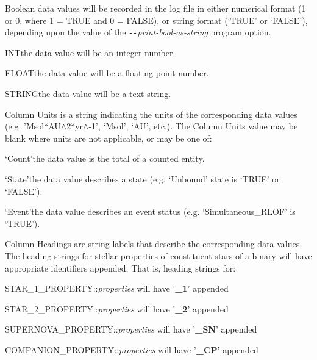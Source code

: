 \hfill
\begin{minipage}{\dimexpr\textwidth-7.5em}
Boolean data values will be recorded in the log file in either numerical format (1 or 0, where 1 = TRUE and  0 = FALSE), or string format (`TRUE' or `FALSE'), depending upon the value of the \textit{\texttt{-{}-}print-bool-as-string} program option.
\end{minipage}

\medskip
\medskip
\tabto{3em}INT\tabto{7.5em}the data value will be an integer number.

\tabto{3em}FLOAT\tabto{7.5em}the data value will be a floating-point number.

\tabto{3em}STRING\tabto{7.5em}the data value will be a text string.

\bigskip
Column Units is a string indicating the units of the corresponding data values (e.g. 'Msol*AU$\mathrm{\wedge}$2*yr$\mathrm{\wedge}$-1', `Msol', `AU', etc.).  The Column Units value may be blank where units are not applicable, or may be one of:

\tabto{3em}`Count'\tabto{7.5em}the data value is the total of a counted entity.

\tabto{3em}`State'\tabto{7.5em}the data value describes a state (e.g. `Unbound' state is `TRUE' or `FALSE').

\tabto{3em}`Event'\tabto{7.5em}the data value describes an event status (e.g. `Simultaneous\_RLOF' is `TRUE').

\bigskip
Column Headings are string labels that describe the corresponding data values. The heading strings for stellar properties of constituent stars of a binary will have appropriate identifiers appended. That is, heading strings for:

\hfill
\begin{minipage}{\dimexpr\textwidth-3em}
\medskip
STAR\_1\_PROPERTY::\textit{properties} will have '\textbf{\_1}' appended

\medskip
STAR\_2\_PROPERTY::\textit{properties} will have '\textbf{\_2}' appended

\medskip
SUPERNOVA\_PROPERTY::\textit{properties} will have '\textbf{\_SN}' appended

\medskip
COMPANION\_PROPERTY::\textit{properties} will have '\textbf{\_CP}' appended
\end{minipage}
